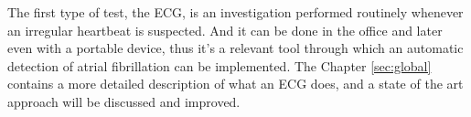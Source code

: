 The first type of test, the ECG, is an investigation performed routinely whenever an irregular heartbeat is suspected. And it can be done in the office and later even with a portable device, thus it's a relevant tool through which an automatic detection of atrial fibrillation can be implemented. The Chapter \ref{sec:global} contains a more detailed description of what an ECG does, and a state of the art approach will be discussed and improved. 
